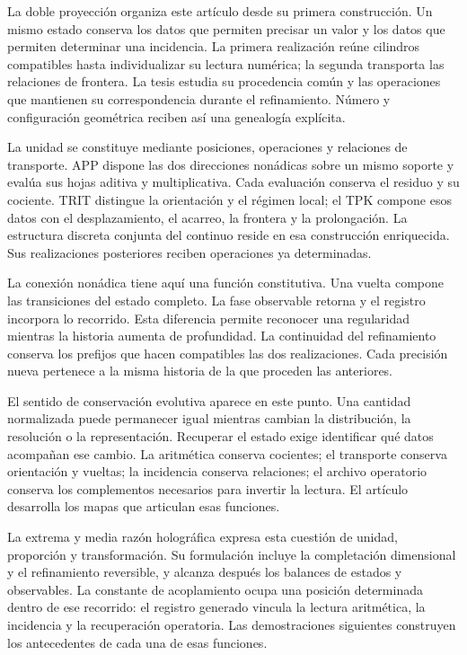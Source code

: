 
La doble proyección organiza este artículo desde su primera construcción. Un
mismo estado conserva los datos que permiten precisar un valor y los datos
que permiten determinar una incidencia. La primera realización reúne
cilindros compatibles hasta individualizar su lectura numérica; la segunda
transporta las relaciones de frontera. La tesis estudia su procedencia
común y las operaciones que mantienen su correspondencia durante el
refinamiento. Número y configuración geométrica reciben así una genealogía
explícita.

La unidad se constituye mediante posiciones, operaciones y relaciones de
transporte. APP dispone las dos direcciones nonádicas sobre un mismo
soporte y evalúa sus hojas aditiva y multiplicativa. Cada evaluación
conserva el residuo y su cociente. TRIT distingue la orientación y el
régimen local; el TPK compone esos datos con el desplazamiento, el acarreo,
la frontera y la prolongación. La estructura discreta conjunta del
continuo reside en esa construcción enriquecida. Sus realizaciones
posteriores reciben operaciones ya determinadas.

La conexión nonádica tiene aquí una función constitutiva. Una vuelta
compone las transiciones del estado completo. La fase observable retorna
y el registro incorpora lo recorrido. Esta diferencia permite reconocer
una regularidad mientras la historia aumenta de profundidad. La
continuidad del refinamiento conserva los prefijos que hacen compatibles
las dos realizaciones. Cada precisión nueva pertenece a la misma historia
de la que proceden las anteriores.

El sentido de conservación evolutiva aparece en este punto. Una cantidad
normalizada puede permanecer igual mientras cambian la distribución, la
resolución o la representación. Recuperar el estado exige identificar qué
datos acompañan ese cambio. La aritmética conserva cocientes; el transporte
conserva orientación y vueltas; la incidencia conserva relaciones; el
archivo operatorio conserva los complementos necesarios para invertir la
lectura. El artículo desarrolla los mapas que articulan esas funciones.

La extrema y media razón holográfica expresa esta cuestión de unidad,
proporción y transformación. Su formulación incluye la completación
dimensional y el refinamiento reversible, y alcanza después los balances
de estados y observables. La constante de acoplamiento ocupa una posición
determinada dentro de ese recorrido: el registro generado vincula la
lectura aritmética, la incidencia y la recuperación operatoria. Las
demostraciones siguientes construyen los antecedentes de cada una de esas
funciones.

